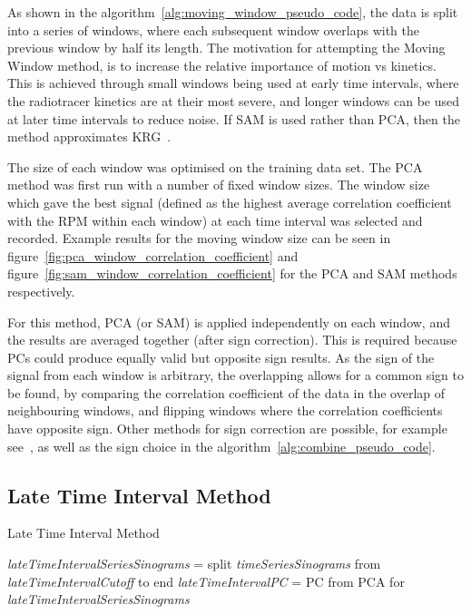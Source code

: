         As shown in the algorithm~\ref{alg:moving_window_pseudo_code}, the data is split into a series of windows, where each subsequent window overlaps with the previous window by half its length. The motivation for attempting the Moving Window method, is to increase the relative importance of motion vs kinetics. This is achieved through small windows being used at early time intervals, where the radiotracer kinetics are at their most severe, and longer windows can be used at later time intervals to reduce noise. If \gls{SAM} is used rather than \gls{PCA}, then the method approximates \gls{KRG}~\parencite{Schleyer2014}.
            
        The size of each window was optimised on the training data set. The \gls{PCA} method was first run with a number of fixed window sizes. The window size which gave the best signal (defined as the highest average correlation coefficient with the \gls{RPM} within each window) at each time interval was selected and recorded. Example results for the moving window size can be seen in figure~\ref{fig:pca_window_correlation_coefficient} and figure~\ref{fig:sam_window_correlation_coefficient} for the \gls{PCA} and \gls{SAM} methods respectively.
            
        For this method, \gls{PCA} (or \gls{SAM}) is applied independently on each window, and the results are averaged together (after sign correction). This is required because \glspl{PC} could produce equally valid but opposite sign results. As the sign of the signal from each window is arbitrary, the overlapping allows for a common sign to be found, by comparing the correlation coefficient of the data in the overlap of neighbouring windows, and flipping windows where the correlation coefficients have opposite sign. Other methods for sign correction are possible, for example see~\parencite{Bertolli2017, Feng2018Self-gating:PET}, as well as the sign choice in the algorithm~\ref{alg:combine_pseudo_code}.
            
    \subsection{Late Time Interval Method} \label{sec:late_time_interval_method}
        \begin{algorithm} \label{alg:late_time_interval_method_pseudo_code}
            \caption{Late Time Interval Method}
            \textit{lateTimeIntervalSeriesSinograms} = split \textit{timeSeriesSinograms} from \textit{lateTimeIntervalCutoff} to end\;
            \textit{lateTimeIntervalPC} = \gls{PC} from \gls{PCA} for \textit{lateTimeIntervalSeriesSinograms}\;
            \;
        \end{algorithm}
            
